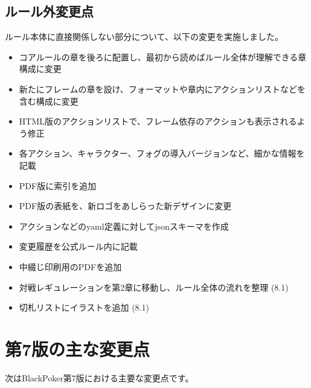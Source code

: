 \documentclass[letterpaper,10pt,dvipdfmx]{sphinxmanual}
\begin{document}
\subsection{ルール外変更点}
\label{\detokenize{revision-history/8th:id9}}
\sphinxAtStartPar
ルール本体に直接関係しない部分について、以下の変更を実施しました。
\begin{itemize}
\item {} 
\sphinxAtStartPar
コアルールの章を後ろに配置し、最初から読めばルール全体が理解できる章構成に変更

\item {} 
\sphinxAtStartPar
新たにフレームの章を設け、フォーマットや章内にアクションリストなどを含む構成に変更

\item {} 
\sphinxAtStartPar
HTML版のアクションリストで、フレーム依存のアクションも表示されるよう修正

\item {} 
\sphinxAtStartPar
各アクション、キャラクター、フォグの導入バージョンなど、細かな情報を記載

\item {} 
\sphinxAtStartPar
PDF版に索引を追加

\item {} 
\sphinxAtStartPar
PDF版の表紙を、新ロゴをあしらった新デザインに変更

\item {} 
\sphinxAtStartPar
アクションなどのyaml定義に対してjsonスキーマを作成

\item {} 
\sphinxAtStartPar
変更履歴を公式ルール内に記載

\item {} 
\sphinxAtStartPar
中綴じ印刷用のPDFを追加

\item {} 
\sphinxAtStartPar
対戦レギュレーションを第2章に移動し、ルール全体の流れを整理 (8.1)

\item {} 
\sphinxAtStartPar
切札リストにイラストを追加 (8.1)

\end{itemize}

\sphinxstepscope


\section{第7版の主な変更点}
\label{\detokenize{revision-history/7th:id1}}\label{\detokenize{revision-history/7th::doc}}
\sphinxAtStartPar
次はBlackPoker第7版における主要な変更点です。
\end{document}
